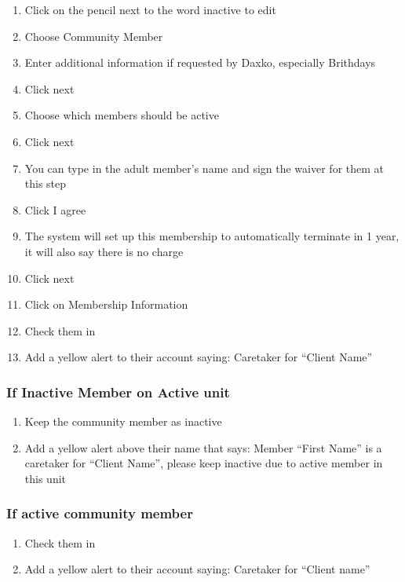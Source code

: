 \documentclass[
]{report}
\providecommand{\tightlist}{%
  \setlength{\itemsep}{0pt}\setlength{\parskip}{0pt}}\usepackage{longtable,booktabs,array}
\begin{document}
\begin{enumerate}
\def\labelenumi{\arabic{enumi}.}
\setcounter{enumi}{7}
\tightlist
\item
  Click on the pencil next to the word inactive to edit
\item
  Choose Community Member
\item
  Enter additional information if requested by Daxko, especially
  Brithdays
\item
  Click next
\item
  Choose which members should be active
\item
  Click next
\item
  You can type in the adult member's name and sign the waiver for them
  at this step
\item
  Click I agree
\item
  The system will set up this membership to automatically terminate in 1
  year, it will also say there is no charge
\item
  Click next
\item
  Click on Membership Information
\item
  Check them in
\item
  Add a yellow alert to their account saying: Caretaker for ``Client
  Name''
\end{enumerate}

\hypertarget{if-inactive-member-on-active-unit-1}{%
\subsubsection{If Inactive Member on Active
unit}\label{if-inactive-member-on-active-unit-1}}

\begin{enumerate}
\def\labelenumi{\arabic{enumi}.}
\setcounter{enumi}{20}
\tightlist
\item
  Keep the community member as inactive
\item
  Add a yellow alert above their name that says: Member ``First Name''
  is a caretaker for ``Client Name'', please keep inactive due to active
  member in this unit
\end{enumerate}

\hypertarget{if-active-community-member}{%
\subsubsection{If active community
member}\label{if-active-community-member}}

\begin{enumerate}
\def\labelenumi{\arabic{enumi}.}
\setcounter{enumi}{22}
\tightlist
\item
  Check them in
\item
  Add a yellow alert to their account saying: Caretaker for ``Client
  name''
\end{enumerate}
\end{document}
